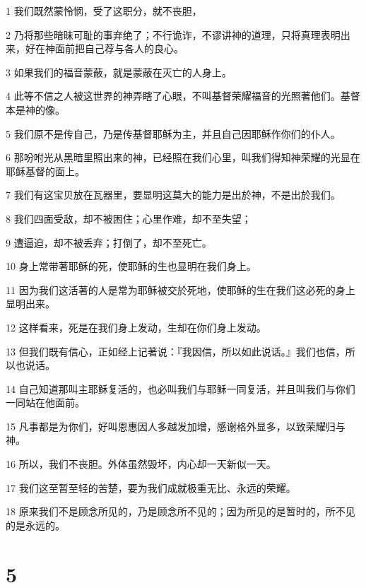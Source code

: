 \par 1 我们既然蒙怜悯，受了这职分，就不丧胆，
\par 2 乃将那些暗昧可耻的事弃绝了；不行诡诈，不谬讲神的道理，只将真理表明出来，好在神面前把自己荐与各人的良心。
\par 3 如果我们的福音蒙蔽，就是蒙蔽在灭亡的人身上。
\par 4 此等不信之人被这世界的神弄瞎了心眼，不叫基督荣耀福音的光照著他们。基督本是神的像。
\par 5 我们原不是传自己，乃是传基督耶稣为主，并且自己因耶稣作你们的仆人。
\par 6 那吩咐光从黑暗里照出来的神，已经照在我们心里，叫我们得知神荣耀的光显在耶稣基督的面上。
\par 7 我们有这宝贝放在瓦器里，要显明这莫大的能力是出於神，不是出於我们。
\par 8 我们四面受敌，却不被困住；心里作难，却不至失望；
\par 9 遭逼迫，却不被丢弃；打倒了，却不至死亡。
\par 10 身上常带著耶稣的死，使耶稣的生也显明在我们身上。
\par 11 因为我们这活著的人是常为耶稣被交於死地，使耶稣的生在我们这必死的身上显明出来。
\par 12 这样看来，死是在我们身上发动，生却在你们身上发动。
\par 13 但我们既有信心，正如经上记著说：『我因信，所以如此说话。』我们也信，所以也说话。
\par 14 自己知道那叫主耶稣复活的，也必叫我们与耶稣一同复活，并且叫我们与你们一同站在他面前。
\par 15 凡事都是为你们，好叫恩惠因人多越发加增，感谢格外显多，以致荣耀归与神。
\par 16 所以，我们不丧胆。外体虽然毁坏，内心却一天新似一天。
\par 17 我们这至暂至轻的苦楚，要为我们成就极重无比、永远的荣耀。
\par 18 原来我们不是顾念所见的，乃是顾念所不见的；因为所见的是暂时的，所不见的是永远的。

\chapter{5}

